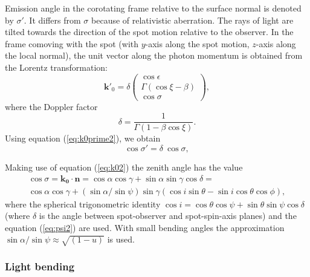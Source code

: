 \documentclass{wihuri}
\def\be{\begin{equation}}
\def\ee{\end{equation}}
\def\Dop{\delta}
\newcommand{\bmath}[1]{\boldsymbol{#1}}
\begin{document}

Emission angle in the corotating frame relative to the surface normal is denoted by
$\sigma'$.  It differs from $\sigma$ because of relativistic aberration. The rays of light are tilted towards the direction of the spot motion relative to the observer.
In the frame comoving with the spot 
(with $y$-axis along the spot motion, $z$-axis along the local normal), 
the unit vector along the photon momentum  is 
obtained from the Lorentz transformation: 
\be \label{eq:k0prime2}
\bmath{k}'_0 = \Dop
\left( \begin{array}{c}
\cos \epsilon \\
\Gamma (\cos\xi-\beta)\\ 
\cos\sigma
\end{array}
\right) ,
\ee 
where  the Doppler factor 
\be \label{eq:dop2}
\Dop=\frac{1}{\Gamma(1-\beta\cos\xi)} .
\ee
Using equation (\ref{eq:k0prime2}), we obtain
\be \label{eq:aberr2}
\cos\sigma' =   \Dop \ \cos\sigma ,
\ee
 
Making use of equation (\ref{eq:k02}) the zenith angle has the value
\be\label{eq:cossigma2}
\begin{split}
\cos\sigma = \bmath{k_{0}}\cdot\bmath{n} = \cos\alpha\cos\gamma+\sin\alpha\sin\gamma\cos\delta = \\
\cos \alpha  \cos \gamma + (\sin \alpha / \sin \psi) \sin \gamma (\cos i \sin \theta - \sin i \cos \theta \cos \phi),
\end{split}
\ee
where the spherical trigonometric identity $\cos i = \cos\theta\cos\psi+\sin\theta\sin\psi\cos\delta$ (where $\delta$ is the angle between spot-observer and spot-spin-axis planes) and the equation (\ref{eq:psi2}) are used. With small bending angles the approximation $\sin \alpha / \sin \psi \approx \sqrt{(1-u)}$ is used.



\subsubsection{Light bending}
\end{document}
